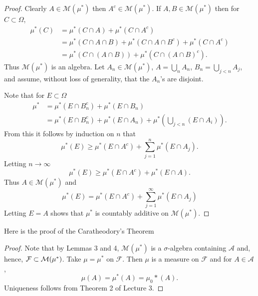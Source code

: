 \begin{proof}
Clearly $A\in\mathcal{M}(\mu^*)$ then $A^c\in\mathcal M(\mu^*)$. If $A, B\in \mathcal M(\mu^*)$ then for $C\subset \Omega$,
\begin{align*}
\mu^*(C)&=\mu^*(C\cap A)+\mu^*(C\cap A^c)\\
 &=\mu^*(C\cap A\cap B)+\mu^*(C\cap A\cap B^c)+\mu^*(C\cap A^c)\\
 &=\mu^*(C\cap(A\cap B))+\mu^*(C\cap (A\cap B)^c).
\end{align*}
Thus $\mathcal M(\mu^*)$ is an algebra. Let $A_n\in\mathcal M(\mu^*)$, $A=\bigcup_n A_n$, $B_n=\bigcup_{j<n}A_j$, and assume, without loss of generality, that the $A_n$'s are disjoint.

Note that for $E\subset \Omega$
\begin{align*}
\mu^*&=\mu^*(E\cap B_n^c)+\mu^*(E\cap B_n)\\
 &=\mu^*(E\cap B_n^c)+\mu^*(E\cap A_n)+\mu^*\left(\bigcup_{j<n}(E\cap A_i)\right).
\end{align*}
From this it follows by induction on $n$ that
\begin{equation*}
\mu^*(E)\geq \mu^*(E\cap A^c)+\sum_{j=1}^{n}\mu^*(E\cap A_j).
\end{equation*}
Letting $n\to \infty$
\begin{equation*}
\mu^*(E)\geq \mu^*(E\cap A^c)+\mu^*(E\cap A).
\end{equation*}
Thus $A\in\mathcal M(\mu^*)$ and
\begin{equation}
\mu^*(E)=\mu^*(E\cap A^c)+\sum_{j=1}^\infty\mu^*(E\cap A_j)
\end{equation}
Letting $E=A$ shows that $\mu^*$ is countably additive on $\mathcal M(\mu^*)$.
\end{proof}

Here is the proof of the Caratheodory's Theorem

\begin{proof}
Note that by Lemmas 3 and 4, $\mathcal M(\mu^*)$ is a $\sigma$-algebra containing $\mathcal A$ and, hence, $\mathcal F\subset \mathcal M(\mu^*)$. Take $\mu=\mu^*$ on $\mathcal F$. Then $\mu$ is a measure on $\mathcal{F}$ and for $A\in \mathcal A$,
\begin{equation*}
\mu(A)=\mu^*(A)=\mu_0*(A).
\end{equation*}
Uniqueness follows from Theorem 2 of Lecture 3.
\end{proof}